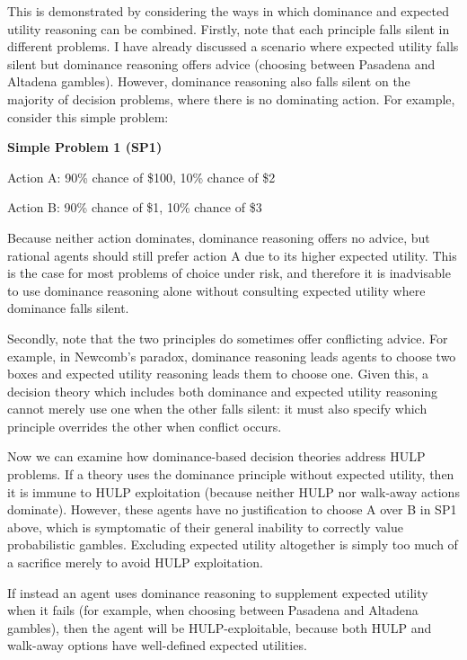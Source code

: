 \documentclass{article}
\begin{document}
This is demonstrated by considering the ways in which dominance and expected utility reasoning can be combined. Firstly, note that each principle falls silent in different problems. I have already discussed a scenario where expected utility falls silent but dominance reasoning offers advice (choosing between Pasadena and Altadena gambles). However, dominance reasoning also falls silent on the majority of decision problems, where there is no dominating action. For example, consider this simple problem:

\begin{center}
\textbf{Simple Problem 1 (SP1)}

Action A: 90\% chance of \$100, 10\% chance of \$2

Action B: 90\% chance of \$1, 10\% chance of \$3
\end{center}

Because neither action dominates, dominance reasoning offers no advice, but rational agents should still prefer action A due to its higher expected utility. This is the case for most problems of choice under risk, and therefore it is inadvisable to use dominance reasoning alone without consulting expected utility where dominance falls silent.

Secondly, note that the two principles do sometimes offer conflicting advice. For example, in Newcomb's paradox, dominance reasoning leads agents to choose two boxes and expected utility reasoning leads them to choose one\citep[pg. 110]{resnik1987choices}. Given this, a decision theory which includes both dominance and expected utility reasoning cannot merely use one when the other falls silent: it must also specify which principle overrides the other when conflict occurs.

Now we can examine how dominance-based decision theories address HULP problems. If a theory uses the dominance principle without expected utility, then it is immune to HULP exploitation (because neither HULP nor walk-away actions dominate). However, these agents have no justification to choose A over B in SP1 above, which is symptomatic of their general inability to correctly value probabilistic gambles. Excluding expected utility altogether is simply too much of a sacrifice merely to avoid HULP exploitation.

If instead an agent uses dominance reasoning to supplement expected utility when it fails (for example, when choosing between Pasadena and Altadena gambles), then the agent will be HULP-exploitable, because both HULP and walk-away options have well-defined expected utilities. 
\end{document}
